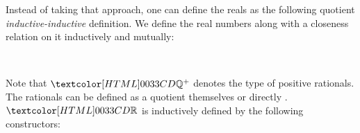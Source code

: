 Instead of taking that approach, one can define the reals as the
following quotient \emph{inductive-inductive} definition. We define
the real numbers along with a closeness relation on it inductively and
mutually:
\begin{sorts}
  \sortnamety{\realty}{\Set} \\
  \sortnamety{\realrel{\_}{\_}{\_}}{\ratty_+ \to \realty \to \realty \to \Set}
\end{sorts}

Note that $\ratty^+$ denotes the type of positive rationals. The
rationals can be defined as a quotient themselves or directly
\cite{Altenkirch2011ii}. $\realty$ is inductively defined by the
following constructors:

\begin{datatype}{\realty}{}
  \constr{\realrat}{\ratty \to \realty} \\
   \\
\end{datatype}

